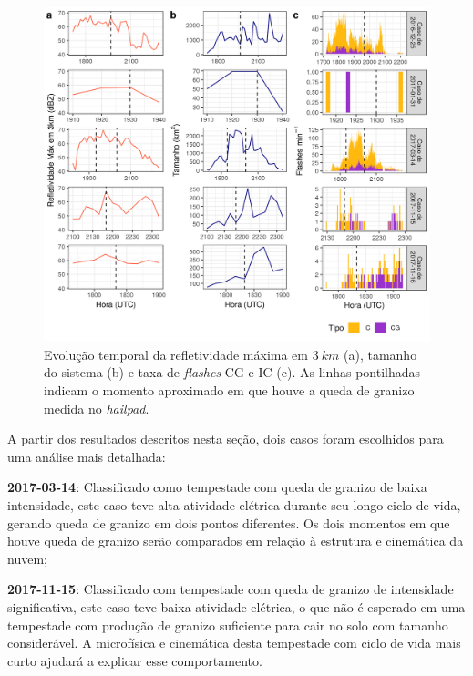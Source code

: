 \begin{figure}[htb]
	\begin{center}
		\caption{Evolução temporal da refletividade máxima em $3\:km$ (a), tamanho do sistema (b) e taxa de \textit{flashes} CG e IC (c). As linhas pontilhadas indicam o momento aproximado em que houve a queda de granizo medida no \textit{hailpad}.} 
		\label{painel_ciclo}
		\includegraphics[width=0.99\columnwidth]{../General_Processing/figures/cases_dbz_size_lightning_ptbr.png}
	\end{center}
\end{figure}



A partir dos resultados descritos nesta seção, dois casos foram escolhidos para uma análise mais detalhada:

\begin{alineas}
	\item \textbf{2017-03-14}: Classificado como tempestade com queda de granizo de baixa intensidade, este caso teve alta atividade elétrica durante seu longo ciclo de vida, gerando queda de granizo em dois pontos diferentes. Os dois momentos em que houve queda de granizo serão comparados em relação à estrutura e cinemática da nuvem;
	\item \textbf{2017-11-15}: Classificado com tempestade com queda de granizo de intensidade significativa, este caso teve baixa atividade elétrica, o que não é esperado em uma tempestade com produção de granizo suficiente para cair no solo com tamanho considerável. A microfísica e cinemática desta tempestade com ciclo de vida mais curto ajudará a explicar esse comportamento.
\end{alineas}

